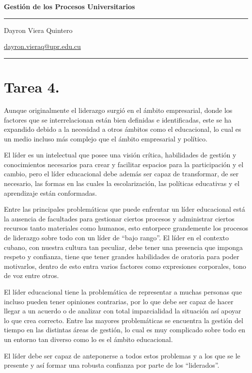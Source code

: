 \documentclass{article}
\newcommand{\notfoot}{\justifying\fontsize{13}{18}\selectfont}
\begin{document}
	{\bf\Large\color{uprgreen} Gestión de los Procesos Universitarios}
\\
	
	{\color{uprgreen}\hrule}
	\begin{flushleft}
		\begin{minipage}{7cm}
			{\fontsize{13}{18}\selectfont
			Dayron Viera Quintero
			}
		\end{minipage}
		\hfill
		\begin{minipage}{7cm}
			\begin{flushright}
				{\fontsize{13}{18}\selectfont
				\href{mailto:dayron.vieraq@upr.edu.cu}{dayron.vieraq@upr.edu.cu}
				}
			\end{flushright}
		\end{minipage}
	\end{flushleft}
	{\color{uprgreen}\hrule}
	\section*{Tarea 4.}
	
	\notfoot
	
	Aunque originalmente el liderazgo surgió en el ámbito empresarial, donde los factores que se interrelacionan están bien definidas e identificadas, este se ha expandido debido a la necesidad a otros ámbitos como el educacional, lo cual es un medio incluso más complejo que el ámbito empresarial y político. \cite{educ}
	
	El líder es un intelectual que posee una visión crítica, habilidades de gestión y conocimientos necesarios para crear y facilitar espacios para la participación y el cambio, pero el líder educacional debe además ser capaz de transformar, de ser necesario, las formas en las cuales la escolarización, las políticas educativas y el aprendizaje están conformadas.\cite{PGL}\cite{BLE}
	
	Entre las principales problemáticas que puede enfrentar un líder educacional está la ausencia de facultades para gestionar ciertos procesos y administrar ciertos recursos tanto materiales como humanos, esto entorpece grandemente los procesos de liderazgo sobre todo con un líder de ``bajo rango''. El líder en el contexto cubano, con nuestra cultura tan peculiar, debe tener una presencia que imponga respeto y confianza, tiene que tener grandes habilidades de oratoria para poder motivarlos, dentro de esto entra varios factores como expresiones corporales, tono de voz entre otros.
	
	El líder educacional tiene la problemática de representar a muchas personas que incluso pueden tener opiniones contrarias, por lo que debe ser capaz de hacer llegar a un acuerdo o de analizar con total imparcialidad la situación así apoyar lo que crea correcto. Entre las mayores problemáticas se encuentra la gestión del tiempo en las distintas áreas de gestión, lo cual es muy complicado sobre todo en un entorno tan diverso como lo es el ámbito educacional.
	
	El líder debe ser capaz de anteponerse a todos estos problemas y a los que se le presente y así formar una robusta confianza por parte de los ``liderados''.

	
	
\end{document}
